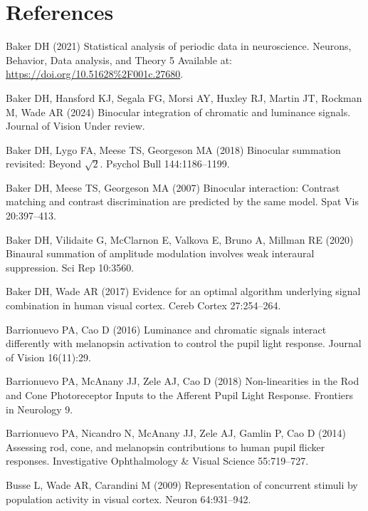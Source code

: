 \documentclass[
]{article}
\begin{document}
\hypertarget{references}{%
\section{References}\label{references}}

\hypertarget{refs}{}
\leavevmode\hypertarget{ref-Baker2021}{}%
Baker DH (2021) Statistical analysis of periodic data in neuroscience. Neurons, Behavior, Data analysis, and Theory 5 Available at: \url{https://doi.org/10.51628\%2F001c.27680}.

\leavevmode\hypertarget{ref-Baker2024}{}%
Baker DH, Hansford KJ, Segala FG, Morsi AY, Huxley RJ, Martin JT, Rockman M, Wade AR (2024) Binocular integration of chromatic and luminance signals. Journal of Vision Under review.

\leavevmode\hypertarget{ref-Baker2018}{}%
Baker DH, Lygo FA, Meese TS, Georgeson MA (2018) Binocular summation revisited: Beyond \(\sqrt{2}\). Psychol Bull 144:1186--1199.

\leavevmode\hypertarget{ref-Baker2007}{}%
Baker DH, Meese TS, Georgeson MA (2007) Binocular interaction: Contrast matching and contrast discrimination are predicted by the same model. Spat Vis 20:397--413.

\leavevmode\hypertarget{ref-Baker2020}{}%
Baker DH, Vilidaite G, McClarnon E, Valkova E, Bruno A, Millman RE (2020) Binaural summation of amplitude modulation involves weak interaural suppression. Sci Rep 10:3560.

\leavevmode\hypertarget{ref-Baker2017}{}%
Baker DH, Wade AR (2017) Evidence for an optimal algorithm underlying signal combination in human visual cortex. Cereb Cortex 27:254--264.

\leavevmode\hypertarget{ref-Barrionuevo2016}{}%
Barrionuevo PA, Cao D (2016) Luminance and chromatic signals interact differently with melanopsin activation to control the pupil light response. Journal of Vision 16(11):29.

\leavevmode\hypertarget{ref-Barrionuevo2018}{}%
Barrionuevo PA, McAnany JJ, Zele AJ, Cao D (2018) Non-linearities in the Rod and Cone Photoreceptor Inputs to the Afferent Pupil Light Response. Frontiers in Neurology 9.

\leavevmode\hypertarget{ref-Barrionuevo2014}{}%
Barrionuevo PA, Nicandro N, McAnany JJ, Zele AJ, Gamlin P, Cao D (2014) Assessing rod, cone, and melanopsin contributions to human pupil flicker responses. Investigative Ophthalmology \& Visual Science 55:719--727.

\leavevmode\hypertarget{ref-Busse2009}{}%
Busse L, Wade AR, Carandini M (2009) Representation of concurrent stimuli by population activity in visual cortex. Neuron 64:931--942.
\end{document}
